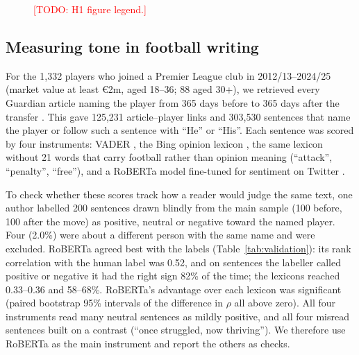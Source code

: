 \documentclass[9pt,twocolumn,twoside]{pnas-new}
\newcommand{\todo}[1]{\textcolor{red}{[TODO: #1]}}
\begin{document}
\begin{figure}[tbhp]
\centering
\fbox{\parbox[c][3.2cm][c]{0.9\linewidth}{\centering\todo{H1 figure: share joining the PL by age group and season, with the shuffle null}}}
\caption{\todo{H1 figure legend.}}
\label{fig:h1}
\end{figure}

\subsection*{Measuring tone in football writing}
For the 1,332 players who joined a Premier League club in 2012/13--2024/25 (market value at least \euro2m, aged 18--36; 88 aged 30+), we retrieved every Guardian article naming the player from 365 days before to 365 days after the transfer \cite{guardian_api}. This gave 125,231 article--player links and 303,530 sentences that name the player or follow such a sentence with ``He'' or ``His''. Each sentence was scored by four instruments: VADER \cite{hutto2014vader}, the Bing opinion lexicon \cite{hu2004mining}, the same lexicon without 21 words that carry football rather than opinion meaning (``attack'', ``penalty'', ``free''), and a RoBERTa model fine-tuned for sentiment on Twitter \cite{liu2019roberta,barbieri2020tweeteval,loureiro2022timelms}.

To check whether these scores track how a reader would judge the same text, one author labelled 200 sentences drawn blindly from the main sample (100 before, 100 after the move) as positive, neutral or negative toward the named player. Four (2.0\%) were about a different person with the same name and were excluded. RoBERTa agreed best with the labels (Table~\ref{tab:validation}): its rank correlation with the human label was 0.52, and on sentences the labeller called positive or negative it had the right sign 82\% of the time; the lexicons reached 0.33--0.36 and 58--68\%. RoBERTa's advantage over each lexicon was significant (paired bootstrap 95\% intervals of the difference in $\rho$ all above zero). All four instruments read many neutral sentences as mildly positive, and all four misread sentences built on a contrast (``once struggled, now thriving''). We therefore use RoBERTa as the main instrument and report the others as checks.
\end{document}
